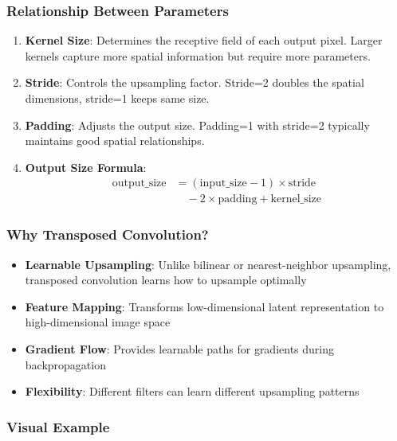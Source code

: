 \documentclass[conference,12pt]{IEEEtran}
\begin{document}
\subsubsection{Relationship Between Parameters}

\begin{enumerate}
    \item \textbf{Kernel Size}: Determines the receptive field of each output pixel. Larger kernels capture more spatial information but require more parameters.
    
    \item \textbf{Stride}: Controls the upsampling factor. Stride=2 doubles the spatial dimensions, stride=1 keeps same size.
    
    \item \textbf{Padding}: Adjusts the output size. Padding=1 with stride=2 typically maintains good spatial relationships.
    
    \item \textbf{Output Size Formula}:
    \begin{align}
        \text{output\_size} &= (\text{input\_size} - 1) \times \text{stride} \\
        &\quad - 2 \times \text{padding} + \text{kernel\_size}
    \end{align}
\end{enumerate}

\subsubsection{Why Transposed Convolution?}

\begin{itemize}
    \item \textbf{Learnable Upsampling}: Unlike bilinear or nearest-neighbor upsampling, transposed convolution learns how to upsample optimally
    \item \textbf{Feature Mapping}: Transforms low-dimensional latent representation to high-dimensional image space
    \item \textbf{Gradient Flow}: Provides learnable paths for gradients during backpropagation
    \item \textbf{Flexibility}: Different filters can learn different upsampling patterns
\end{itemize}

\subsubsection{Visual Example}
\end{document}

